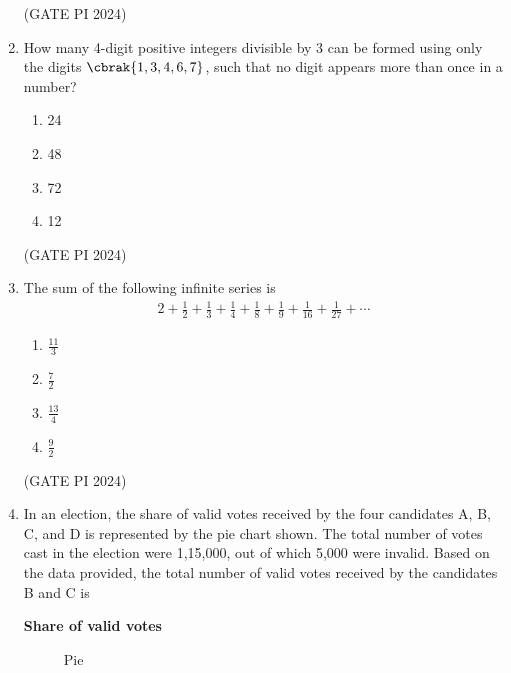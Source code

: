\documentclass[journal,12pt,onecolumn]{IEEEtran}
\theoremstyle{remark}
\begin{document}
\begin{enumerate}
\hfill (GATE PI 2024)

\item How many 4-digit positive integers divisible by 3 can be formed using only the digits $\cbrak{1, 3, 4, 6, 7}$, such that no digit appears more than once in a number?

\begin{multicols}{4}
\begin{enumerate}
    \item 24
    \item 48
    \item 72
    \item 12
\end{enumerate}
\end{multicols}

\hfill (GATE PI 2024)

\item The sum of the following infinite series is
\begin{align*}
2 + \frac{1}{2} + \frac{1}{3} + \frac{1}{4} + \frac{1}{8} + \frac{1}{9} + \frac{1}{16} + \frac{1}{27} + \cdots
\end{align*}

\begin{multicols}{4}
\begin{enumerate}
    \item $\frac{11}{3}$
    \item $\frac{7}{2}$
    \item $\frac{13}{4}$
    \item $\frac{9}{2}$
\end{enumerate}
\end{multicols}

\hfill (GATE PI 2024)

\item In an election, the share of valid votes received by the four candidates A, B, C, and D is represented by the pie chart shown. The total number of votes cast in the election were 1,15,000, out of which 5,000 were invalid.
Based on the data provided, the total number of valid votes received by the candidates B and C is \\

\begin{center}
\textbf{Share of valid votes}
\end{center}
\begin{figure}[H]
\centering
{}
\caption{Pie}
\end{figure}


\end{enumerate}
\end{document}
